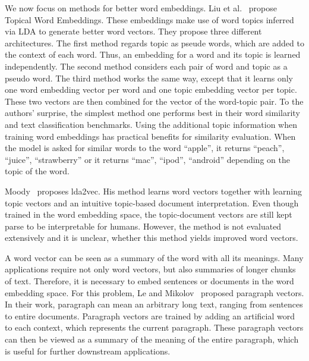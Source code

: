 \documentclass{sig-alternate-05-2015}
\begin{document}
We now focus on methods for better word embeddings.
Liu et al.~\cite{Liu2015} propose Topical Word Embeddings.
These embeddings make use of word topics inferred via LDA to generate better word vectors.
They propose three different architectures.
The first method regards topic as pseude words, which are added to the context of each word.
Thus, an embedding for a word and its topic is learned independently.
The second method considers each pair of word and topic as a pseudo word.
The third method works the same way, except that it learns only one word embedding vector per word and one topic embedding vector per topic.
These two vectors are then combined for the vector of the word-topic pair.
To the authors' surprise, the simplest method one performs best in their word similarity and text classification benchmarks.
Using the additional topic information when training word embeddings has practical benefits for similarity evaluation.
When the model is asked for similar words to the word ``apple'', it returns ``peach'', ``juice'', ``strawberry'' or it returns ``mac'', ``ipod'', ``android'' depending on the topic of the word.

Moody~\cite{Moody2016} proposes lda2vec.
His method learns word vectors together with learning topic vectors and an intuitive topic-based document interpretation.
Even though trained in the word embedding space, the topic-document vectors are still kept parse to be interpretable for humans.
However, the method is not evaluated extensively and it is unclear, whether this method yields improved word vectors.


A word vector can be seen as a summary of the word with all its meanings.
Many applications require not only word vectors, but also summaries of longer chunks of text.
Therefore, it is necessary to embed sentences or documents in the word embedding space.
For this problem, Le and Mikolov~\cite{Le2014} proposed paragraph vectors.
In their work, paragraph can mean an arbitrary long text, ranging from sentences to entire documents.
Paragraph vectors are trained by adding an artificial word to each context, which represents the current paragraph.
These paragraph vectors can then be viewed as a summary of the meaning of the entire paragraph, which is useful for further downstream applications.
\end{document}
